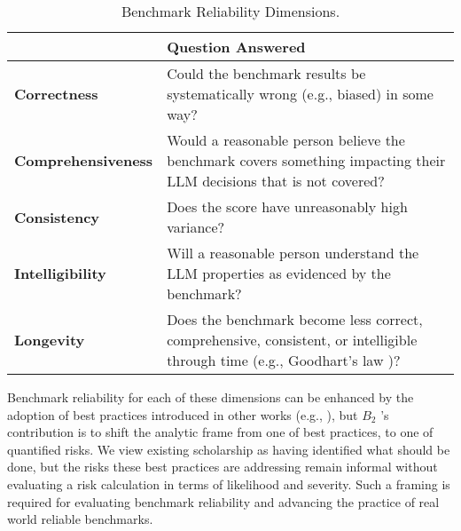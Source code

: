\documentclass{article}
\newcommand\bb{$B_2$ }
\begin{document}
\begin{table}[h!]
  \caption{Benchmark Reliability Dimensions.}
  \label{tab:benchmark-reliability-dimensions}
\label{tab:dimensions}
  \centering
  \begin{tabular}{lp{10cm}}
    \toprule
    & \textbf{Question Answered} \\
    \midrule
    \textbf{Correctness} & Could the benchmark results be systematically wrong (e.g., biased) in some way? \\
    \textbf{Comprehensiveness} & Would a reasonable person believe the benchmark covers something impacting their LLM decisions that is not covered? \\
    \textbf{Consistency} & Does the score have unreasonably high variance? \\
    \textbf{Intelligibility} & Will a reasonable person understand the LLM properties as evidenced by the benchmark? \\
    \textbf{Longevity} & Does the benchmark become less correct, comprehensive, consistent, or intelligible through time (e.g., Goodhart's law \cite{strathern_improving_1997,manheim_categorizing_2019})? \\
    \bottomrule
  \end{tabular}
\end{table}

Benchmark reliability for each of these dimensions can be enhanced by the adoption of best practices introduced in other works (e.g., \cite{reuel2024betterbench,cao2025should}), but \bb's contribution is to shift the analytic frame from one of best practices, to one of quantified risks. We view existing scholarship as having identified what should be done, but the risks these best practices are addressing remain informal without evaluating a risk calculation in terms of likelihood and severity. Such a framing is required for evaluating benchmark reliability and advancing the practice of real world reliable benchmarks.
\end{document}

